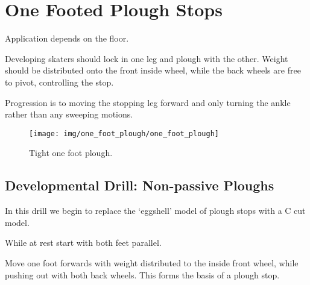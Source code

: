 \section{One Footed Plough Stops}
\label{sec:stopping/plough_one_foot}

Application depends on the floor.

Developing skaters should lock in one leg and plough with the other. 
Weight should be distributed onto the front inside wheel, while the back wheels are free to pivot, controlling the stop. 

Progression is to moving the stopping leg forward and only turning the ankle rather than any sweeping motions. 


\begin{figure}
\centering
\texttt{[image: img/one\_foot\_plough/one\_foot\_plough]}
\caption{Tight one foot plough.}
\end{figure}



\subsection{Developmental Drill: Non-passive Ploughs}
\label{sec:stopping/plough_one_foot/cuts}

In this drill we begin to replace the `eggshell' model of plough stops with a C cut model. 

While at rest start with both feet parallel. 

Move one foot forwards with weight distributed to the inside front wheel, while pushing out with both back wheels.  
This forms the basis of a plough stop.
